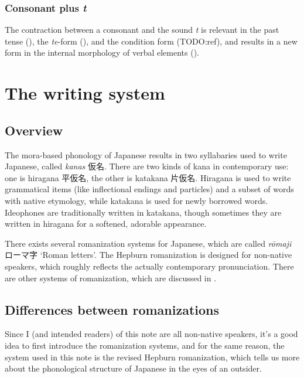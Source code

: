 \documentclass[UTF8, a4paper, oneside, scheme=plain]{ctexrep}
\newcommand*{\term}[1]{\emph{#1}}
\newcommand{\corpus}[1]{\emph{#1}}
\newcommand{\translate}[1]{`#1'}
\begin{document}
\subsubsection{Consonant plus \corpus{t}}\label{sec:t-euphonic}

The contraction between a consonant and the sound \corpus{t} is relevant in 
the past tense (),
the \corpus{te}-form (),
and the condition form (TODO:ref),
and results in a new form in the internal morphology of verbal elements ().

\section{The writing system}

\subsection{Overview}

The mora-based phonology of Japanese results in two syllabaries used to write Japanese,
called \term{kanas} 仮名.
There are two kinds of kana in contemporary use:
one is hiragana 平仮名, the other is katakana 片仮名.
Hiragana is used to write grammatical items (like inflectional endings and particles)
and a subset of words with native etymology,
while katakana is used for newly borrowed words.
Ideophones are traditionally written in katakana,
though sometimes they are written in hiragana for a softened, adorable appearance.

There exists several romanization systems for Japanese,
which are called \corpus{rōmaji} ローマ字 \translate{Roman letters}.
The Hepburn romanization is designed for non-native speakers,
which roughly reflects the actually contemporary pronunciation.
There are other systems of romanization, which are discussed in .

\subsection{Differences between romanizations}\label{sec:romanization}

Since I (and intended readers) of this note are all non-native speakers,
it's a good idea to first introduce the romanization systems,
and for the same reason,
the system used in this note is the revised Hepburn romanization,
which tells us more about the phonological structure of Japanese 
in the eyes of an outsider.
\end{document}
